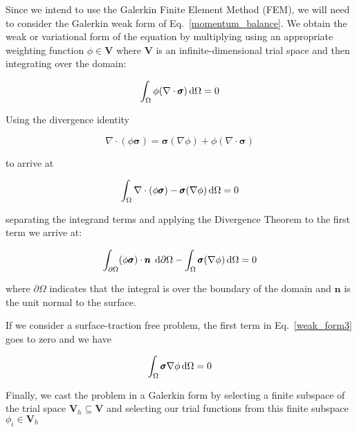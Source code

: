 Since we intend to use the Galerkin Finite Element Method (FEM), we will need to consider the Galerkin weak form of Eq.\ \eqref{momentum_balance}. We obtain the weak or variational form of the equation by multiplying using an appropriate weighting function $\phi \in \pmb{V}$ where $\pmb{V}$ is an infinite-dimensional trial space and then integrating over the domain:

%
\begin{equation}
\int_\Omega \phi(\nabla \cdot \pmb{\sigma}) \mathop{}\!\mathrm{d} \Omega = 0
\label{weak_form1}
\end{equation}
%

Using the divergence identity 

%
\begin{equation}
\nabla \cdot (\phi \pmb{\sigma}) = \pmb{\sigma} (\nabla \phi) + \phi (\nabla \cdot \pmb{\sigma}) \nonumber
\end{equation}
%

to arrive at 

%
\begin{equation}
\int_\Omega \nabla \cdot (\phi \pmb{\sigma}) - \pmb{\sigma} (\nabla \phi) \mathop{}\!\mathrm{d} \Omega = 0
\label{weak_form2}
\end{equation}
%

separating the integrand terms and applying the Divergence Theorem to the first term we arrive at:

%
\begin{equation}
\int_{\partial \Omega} (\phi \pmb{\sigma}) \cdot \pmb{n} \; \mathop{}\!\mathrm{d} \partial \Omega - \int_\Omega \pmb{\sigma} (\nabla \phi) \mathop{}\!\mathrm{d} \Omega = 0
\label{weak_form3}
\end{equation}
%

where $\partial \Omega$ indicates that the integral is over the boundary of the domain and $\textbf{n}$ is the unit normal to the surface.

If we consider a surface-traction free problem, the first term in Eq.\ \eqref{weak_form3} goes to zero and we have

%
\begin{equation}
\int_\Omega \pmb{\sigma} \nabla \phi \mathop{}\!\mathrm{d} \Omega = 0
\label{weak_form}
\end{equation}
%

Finally, we cast the problem in a Galerkin form by selecting a finite subspace of the trial space $\pmb{V}_h \subseteq \pmb{V}$ and selecting our trial functions from this finite subspace $\phi_i \in \pmb{V}_h$

